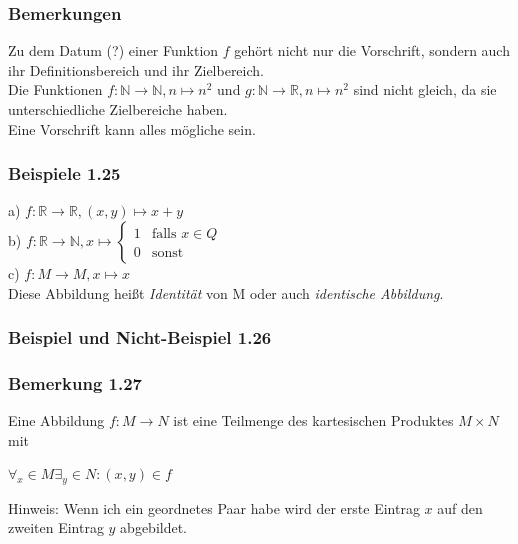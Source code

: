 \documentclass{article}
\begin{document}
\subsubsection*{Bemerkungen}
Zu dem Datum (?) einer Funktion $f$ gehört nicht nur die Vorschrift, sondern auch ihr Definitionsbereich und ihr Zielbereich. \\
Die Funktionen $f: \mathbb{N} \rightarrow \mathbb{N}, n \mapsto n^2$ und $g: \mathbb{N} \rightarrow \mathbb{R}, n \mapsto n^2$ sind nicht gleich, da sie unterschiedliche Zielbereiche haben. \\
Eine Vorschrift kann alles mögliche sein.


\subsubsection*{Beispiele 1.25}
a) $f: \mathbb{R} \rightarrow \mathbb{R}, (x, y) \mapsto x + y$ \\
b) $f: \mathbb{R} \rightarrow \mathbb{N}, x \mapsto 
\begin{cases}
    1 & \text{falls } x \in Q \\
    0 & \text{sonst}
\end{cases}
$ \\
c) $f: M \rightarrow M, x \mapsto x$ \\
Diese Abbildung heißt \textit{Identität} von M oder auch \textit{identische Abbildung}. 

\subsubsection*{Beispiel und Nicht-Beispiel 1.26}

\subsubsection*{Bemerkung 1.27}
Eine Abbildung $f: M \rightarrow N$ ist eine Teilmenge des kartesischen Produktes $M \times N$ mit 
\begin{center}
    $\forall_x \in M \exists_y \in N: (x, y) \in f$
\end{center}
Hinweis: Wenn ich ein geordnetes Paar habe wird der erste Eintrag $x$ auf den zweiten Eintrag $y$ abgebildet. 
\\
\\
\end{document}
